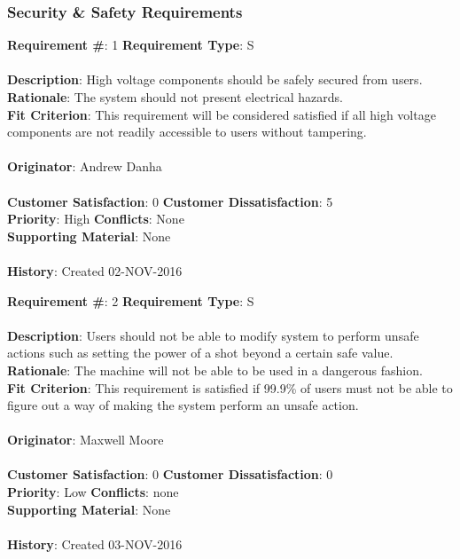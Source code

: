 \documentclass[titlepage]{article}
\begin{document}
\subsubsection{Security \& Safety Requirements}
\begin{framed}
	\noindent\textbf{Requirement \#}: 1 \hfill \textbf{Requirement Type}: S \hfill\\\\
	\noindent\textbf{Description}: High voltage components should be safely secured from users.\\
	\textbf{Rationale}: The system should not present electrical hazards.\\
	\textbf{Fit Criterion}: This requirement will be considered satisfied if all high voltage components are not readily accessible to users without tampering.\\\\
	\textbf{Originator}: Andrew Danha\\\\
	\noindent\textbf{Customer Satisfaction}: 0 \hfill 	\textbf{Customer Dissatisfaction}: 5 \hfill\\
	\textbf{Priority}: High \hfill \textbf{Conflicts}: None \hfill\\
	\textbf{Supporting Material}: None\\\\
	\noindent\textbf{History}: Created 02-NOV-2016
\end{framed}

\begin{framed}
	\noindent\textbf{Requirement \#}: 2 \hfill \textbf{Requirement Type}: S \hfill\\\\
	\noindent\textbf{Description}: Users should not be able to modify system to perform unsafe actions such as setting the power of a shot beyond a certain safe value.\\
	\textbf{Rationale}: The machine will not be able to be used in a dangerous fashion.\\
	\textbf{Fit Criterion}: This requirement is satisfied if 99.9\% of users must not be able to figure out a way of making the system perform an unsafe action.\\\\
	\textbf{Originator}: Maxwell Moore\\\\
	\noindent\textbf{Customer Satisfaction}: 0 \hfill 	\textbf{Customer Dissatisfaction}: 0 \hfill\\
	\textbf{Priority}: Low \hfill \textbf{Conflicts}: none \hfill\\
	\textbf{Supporting Material}: None\\\\
	\noindent\textbf{History}: Created 03-NOV-2016
\end{framed}
\end{document}
